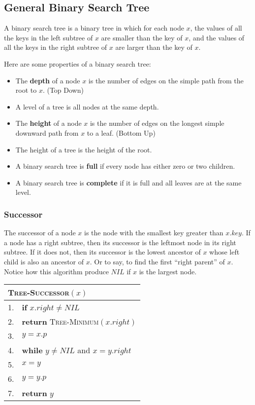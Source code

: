 \documentclass[a4paper,12pt]{article}
\begin{document}
\subsection{General Binary Search Tree}

A binary search tree is a binary tree in which for each node $x$, the values of all the keys in the left subtree of $x$ are smaller than the key of $x$, and the values of all the keys in the right subtree of $x$ are larger than the key of $x$.

Here are some properties of a binary search tree:
\begin{itemize}
	\item The \textbf{depth} of a node $x$ is the number of edges on the simple path from the root to $x$. (Top Down)
	\item A level of a tree is all nodes at the same depth.
	\item The \textbf{height} of a node $x$ is the number of edges on the longest simple downward path from $x$ to a leaf. (Bottom Up)
	\item The height of a tree is the height of the root.
	\item A binary search tree is \textbf{full} if every node has either zero or two children.
	\item A binary search tree is \textbf{complete} if it is full and all leaves are at the same level.
\end{itemize}

\subsubsection{Successor}

The successor of a node $x$ is the node with the smallest key greater than $x.key$.
If a node has a right subtree, then its successor is the leftmost node in its right subtree.
If it does not, then its successor is the lowest ancestor of $x$ whose left child is also an ancestor of $x$.
Or to say, to find the first ``right parent'' of $x$.
Notice how this algorithm produce $NIL$ if $x$ is the largest node.

\begin{center}
	\begin{tabular}{rl}
		\toprule
		\multicolumn{2}{l}{\textsc{Tree-Successor}$(x)$} \\
		\midrule
		1. & \textbf{if} $x.right \neq NIL$ \\
		2. & \quad \textbf{return} \textsc{Tree-Minimum}$(x.right)$ \\
		3. & $y = x.p$ \\
		4. & \textbf{while} $y \neq NIL$ and $x = y.right$ \\
		5. & \quad $x = y$ \\
		6. & \quad $y = y.p$ \\
		7. & \textbf{return} $y$ \\
		\bottomrule
	\end{tabular}
\end{center}
\end{document}
